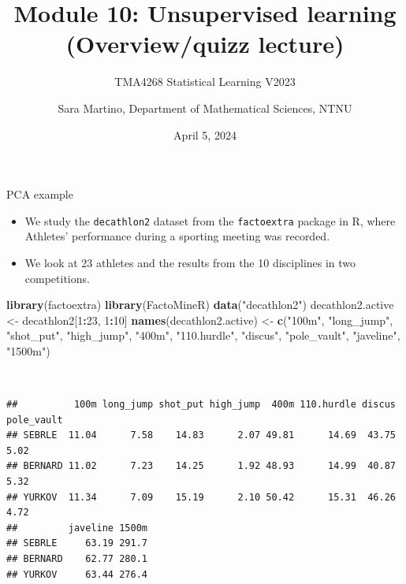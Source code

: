 \documentclass[
  10pt,
  ignorenonframetext,
]{beamer}
\title{Module 10: Unsupervised learning (Overview/quizz lecture)}
\subtitle{TMA4268 Statistical Learning V2023}
\author{Sara Martino, Department of Mathematical Sciences, NTNU}
\date{April 5, 2024}
\newenvironment{Shaded}{\begin{snugshade}}{\end{snugshade}}
\newcommand{\DecValTok}[1]{\textcolor[rgb]{0.00,0.00,0.81}{#1}}
\newcommand{\FunctionTok}[1]{\textcolor[rgb]{0.13,0.29,0.53}{\textbf{#1}}}
\newcommand{\NormalTok}[1]{#1}
\newcommand{\OtherTok}[1]{\textcolor[rgb]{0.56,0.35,0.01}{#1}}
\newcommand{\SpecialCharTok}[1]{\textcolor[rgb]{0.81,0.36,0.00}{\textbf{#1}}}
\newcommand{\StringTok}[1]{\textcolor[rgb]{0.31,0.60,0.02}{#1}}
\begin{document}
\frame{\titlepage}

\begin{frame}[fragile]
\begin{block}{PCA example}
\protect\hypertarget{pca-example}{}
\(~\)

\begin{itemize}
\item
  We study the \texttt{decathlon2} dataset from the \texttt{factoextra}
  package in R, where Athletes' performance during a sporting meeting
  was recorded.
\item
  We look at 23 athletes and the results from the 10 disciplines in two
  competitions.
\end{itemize}

\begin{Shaded}
\begin{Highlighting}[]
\FunctionTok{library}\NormalTok{(factoextra)}
\FunctionTok{library}\NormalTok{(FactoMineR)}
\FunctionTok{data}\NormalTok{(}\StringTok{"decathlon2"}\NormalTok{)}
\NormalTok{decathlon2.active }\OtherTok{\textless{}{-}}\NormalTok{ decathlon2[}\DecValTok{1}\SpecialCharTok{:}\DecValTok{23}\NormalTok{, }\DecValTok{1}\SpecialCharTok{:}\DecValTok{10}\NormalTok{]}
\FunctionTok{names}\NormalTok{(decathlon2.active) }\OtherTok{\textless{}{-}} \FunctionTok{c}\NormalTok{(}\StringTok{"100m"}\NormalTok{, }\StringTok{"long\_jump"}\NormalTok{, }\StringTok{"shot\_put"}\NormalTok{, }\StringTok{"high\_jump"}\NormalTok{,}
    \StringTok{"400m"}\NormalTok{, }\StringTok{"110.hurdle"}\NormalTok{, }\StringTok{"discus"}\NormalTok{, }\StringTok{"pole\_vault"}\NormalTok{, }\StringTok{"javeline"}\NormalTok{, }\StringTok{"1500m"}\NormalTok{)}
\end{Highlighting}
\end{Shaded}

\(~\)

\scriptsize

\begin{verbatim}
##          100m long_jump shot_put high_jump  400m 110.hurdle discus pole_vault
## SEBRLE  11.04      7.58    14.83      2.07 49.81      14.69  43.75       5.02
## BERNARD 11.02      7.23    14.25      1.92 48.93      14.99  40.87       5.32
## YURKOV  11.34      7.09    15.19      2.10 50.42      15.31  46.26       4.72
##         javeline 1500m
## SEBRLE     63.19 291.7
## BERNARD    62.77 280.1
## YURKOV     63.44 276.4
\end{verbatim}
\end{block}
\end{frame}
\end{document}
